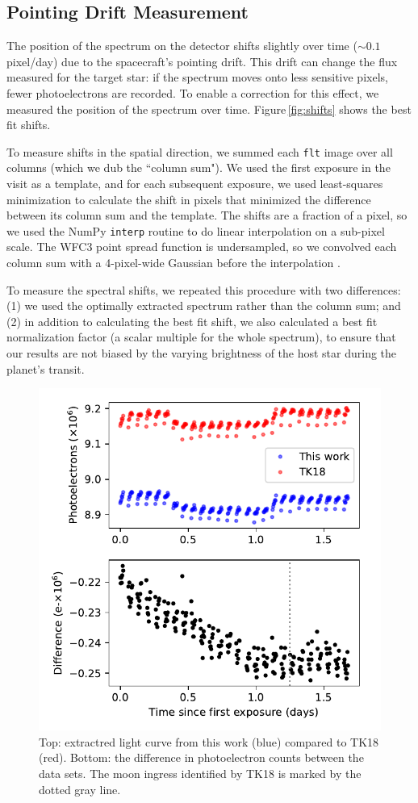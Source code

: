 \documentclass[twocolumn]{aastex62}
\begin{document}
\subsection{Pointing Drift Measurement}
The position of the spectrum on the detector shifts slightly over time ($\sim0.1$ pixel/day) due to the spacecraft's pointing drift. This drift can change the flux measured for the target star: if the spectrum moves onto less sensitive pixels, fewer photoelectrons are recorded. To enable a correction for this effect, we measured the position of the spectrum over time.  Figure\,\ref{fig:shifts} shows the best fit shifts. 

To measure shifts in the spatial direction, we summed each \texttt{flt} image over all columns (which we dub the ``column sum"). We used the first exposure in the visit as a template, and for each subsequent exposure, we used least-squares minimization to calculate the shift in pixels that minimized the difference between its column sum and the template. The shifts are a fraction of a pixel, so we used the NumPy \texttt{interp} routine to do linear interpolation on a sub-pixel scale. The WFC3 point spread function is undersampled, so we convolved each column sum with a 4-pixel-wide Gaussian  before the interpolation \citep[following][]{deming13}.  

To measure the spectral shifts, we repeated this procedure with two differences: (1) we used the optimally extracted spectrum rather than the column sum; and (2) in addition to calculating the best fit shift, we also calculated a best fit normalization factor (a scalar multiple for the whole spectrum), to ensure that our results are not biased by the varying brightness of the host star during the planet's transit. 


\begin{figure}
\includegraphics[width = 0.5 \textwidth]{fig2_rawdata.pdf}
    \caption{Top: extractred light curve from this work (blue) compared to TK18 (red). Bottom: the difference in photoelectron counts between the data sets. The moon ingress identified by TK18 is marked by the dotted gray line.}
\label{fig:raw}
\end{figure}
\end{document}
